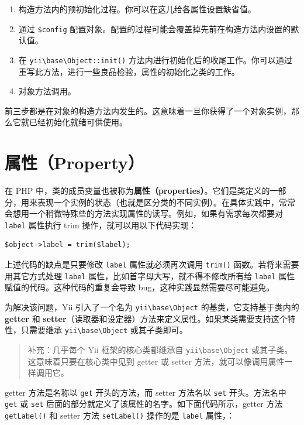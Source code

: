 \begin{enumerate}
\item 构造方法内的预初始化过程。你可以在这儿给各属性设置缺省值。
\item 通过 \lstinline|$config| 配置对象。配置的过程可能会覆盖掉先前在构造方法内设置的默认值。
\item 在 \texttt{yii{\allowbreak{}\textbackslash}base{\allowbreak{}\textbackslash}Object\allowbreak{}::\allowbreak{}init()} 方法内进行初始化后的收尾工作。你可以通过重写此方法，进行一些良品检验，属性的初始化之类的工作。
\item 对象方法调用。
\end{enumerate}
前三步都是在对象的构造方法内发生的。这意味着一旦你获得了一个对象实例，那么它就已经初始化就绪可供使用。



\label{concept-properties.md}\section{属性（Property）}
在 PHP 中，类的成员变量也被称为\textbf{属性（properties）}。它们是类定义的一部分，用来表现一个实例的状态（也就是区分类的不同实例）。在具体实践中，常常会想用一个稍微特殊些的方法实现属性的读写。例如，如果有需求每次都要对 \lstinline|label| 属性执行 trim 操作，就可以用以下代码实现：

\lstset{language=php}\begin{lstlisting}
$object->label = trim($label);
\end{lstlisting}
上述代码的缺点是只要修改 \lstinline|label| 属性就必须再次调用 \lstinline|trim()| 函数。若将来需要用其它方式处理 \lstinline|label| 属性，比如首字母大写，就不得不修改所有给 \lstinline|label| 属性赋值的代码。这种代码的重复会导致 bug，这种实践显然需要尽可能避免。

为解决该问题，Yii 引入了一个名为 \texttt{yii{\allowbreak{}\textbackslash}base{\allowbreak{}\textbackslash}Object} 的基类，它支持基于类内的 \textbf{getter} 和 \textbf{setter}（读取器和设定器）方法来定义属性。如果某类需要支持这个特性，只需要继承 \texttt{yii{\allowbreak{}\textbackslash}base{\allowbreak{}\textbackslash}Object} 或其子类即可。

\begin{quote}补充：几乎每个 Yii 框架的核心类都继承自 \texttt{yii{\allowbreak{}\textbackslash}base{\allowbreak{}\textbackslash}Object} 或其子类。这意味着只要在核心类中见到 getter 或 setter 方法，就可以像调用属性一样调用它。

\end{quote}
getter 方法是名称以 \lstinline|get| 开头的方法，而 setter 方法名以 \lstinline|set| 开头。方法名中 \lstinline|get| 或 \lstinline|set| 后面的部分就定义了该属性的名字。如下面代码所示，getter 方法 \lstinline|getLabel()| 和 setter 方法 \lstinline|setLabel()| 操作的是 \lstinline|label| 属性，：

